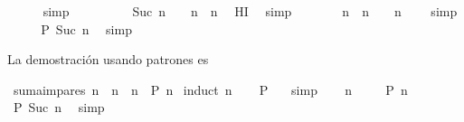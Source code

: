 \begin{isabellebody}
\ \ \ \ \isamarkupfalse%
\ simp\isanewline
\ \ \isamarkupfalse%
\ \isamarkupfalse%
\ {\isachardoublequoteopen}{\isasymdots}\ {\isacharequal}\ {\isacharparenleft}{}\ {\isacharasterisk}\ {\isacharparenleft}Suc\ n{\isacharparenright}\ {\isacharminus}\ {}{\isacharparenright}\ {\isacharplus}\ n\ {\isacharasterisk}\ n{\isachardoublequoteclose}\ \isamarkupfalse%
\ HI\ \isamarkupfalse%
\ simp\isanewline
\ \ \isamarkupfalse%
\ \isamarkupfalse%
\ {\isachardoublequoteopen}{\isasymdots}\ {\isacharequal}\ n\ {\isacharasterisk}\ n\ {\isacharplus}\ {}\ {\isacharasterisk}\ n\ {\isacharplus}\ {}{\isachardoublequoteclose}\ \isamarkupfalse%
\ simp\isanewline
\ \ \isamarkupfalse%
\ \isamarkupfalse%
\ {\isachardoublequoteopen}{\isacharquery}P\ {\isacharparenleft}Suc\ n{\isacharparenright}{\isachardoublequoteclose}\ \isamarkupfalse%
\ simp\isanewline
{}\isamarkupfalse%
%
\endisatagproof
{\isafoldproof}%
%
\isadelimproof
%
\endisadelimproof
%
\begin{isamarkuptext}%
La demostración usando patrones es%
\end{isamarkuptext}\isamarkuptrue%
\isamarkupfalse%
\ {\isachardoublequoteopen}suma{\isacharunderscore}impares\ n\ {\isacharequal}\ n\ {\isacharasterisk}\ n{\isachardoublequoteclose}\ {\isacharparenleft}\ {\isachardoublequoteopen}{\isacharquery}P\ n{\isachardoublequoteclose}{\isacharparenright}\isanewline
%
\isadelimproof
%
\endisadelimproof
%
\isatagproof
{}\isamarkupfalse%
\ {\isacharparenleft}induct\ n{\isacharparenright}\isanewline
\ \ \isamarkupfalse%
\ {\isachardoublequoteopen}{\isacharquery}P\ {}{\isachardoublequoteclose}\ \isamarkupfalse%
\ simp\isanewline
{}\isamarkupfalse%
\isanewline
\ \ \isamarkupfalse%
\ n\ \isanewline
\ \ \isamarkupfalse%
\ {\isachardoublequoteopen}{\isacharquery}P\ n{\isachardoublequoteclose}\isanewline
\ \ \isamarkupfalse%
\ \isamarkupfalse%
\ {\isachardoublequoteopen}{\isacharquery}P\ {\isacharparenleft}Suc\ n{\isacharparenright}{\isachardoublequoteclose}\ \isamarkupfalse%
\ simp\isanewline
{}\isamarkupfalse%
\isanewline
%
\endisatagproof
{\isafoldproof}%
%
\isadelimproof
%
\endisadelimproof
%
\isadelimtheory
%
\endisadelimtheory
%
\isatagtheory
%
\endisatagtheory
{\isafoldtheory}%
%
\isadelimtheory
%
\endisadelimtheory
%
\end{isabellebody}%
